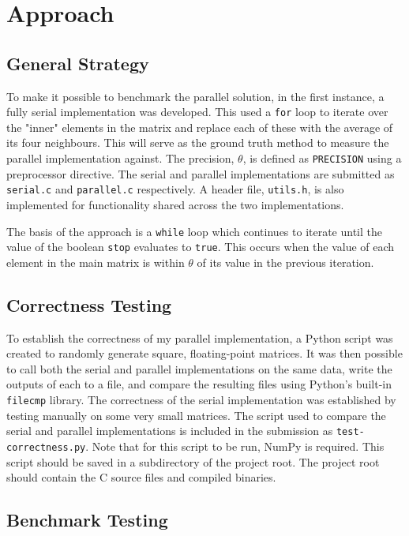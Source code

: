 \section{Approach}

\subsection{General Strategy}

To make it possible to benchmark the parallel solution, in the first instance, a fully serial implementation was developed. This used a \texttt{for} loop to iterate over the "inner" elements in the matrix and replace each of these with the average of its four neighbours. This will serve as the ground truth method to measure the parallel implementation against. The precision, $\theta$, is defined as \texttt{PRECISION} using a preprocessor directive. The serial and parallel implementations are submitted as \texttt{serial.c} and \texttt{parallel.c} respectively. A header file, \texttt{utils.h}, is also implemented for functionality shared across the two implementations.

The basis of the approach is a \texttt{while} loop which continues to iterate until the value of the boolean \texttt{stop} evaluates to \texttt{true}. This occurs when the value of each element in the main matrix is within $\theta$ of its value in the previous iteration.

\subsection{Correctness Testing}

To establish the correctness of my parallel implementation, a Python script was created to randomly generate square, floating-point matrices. It was then possible to call both the serial and parallel implementations on the same data, write the outputs of each to a file, and compare the resulting files using Python's built-in \texttt{filecmp} library. The correctness of the serial implementation was established by testing manually on some very small matrices. The script used to compare the serial and parallel implementations is included in the submission as \texttt{test-correctness.py}. Note that for this script to be run, NumPy \cite{harris2020array} is required. This script should be saved in a subdirectory of the project root. The project root should contain the C source files and compiled binaries.

\subsection{Benchmark Testing} \label{section:benchmark}

